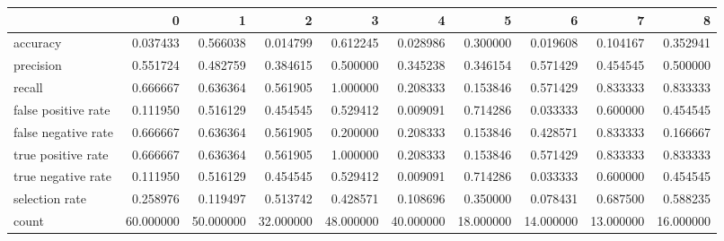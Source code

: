 \begin{tabular}{lrrrrrrrrr}
\toprule
{} &          0 &          1 &          2 &          3 &          4 &          5 &          6 &          7 &          8 \\
\midrule
accuracy            &   0.037433 &   0.566038 &   0.014799 &   0.612245 &   0.028986 &   0.300000 &   0.019608 &   0.104167 &   0.352941 \\
precision           &   0.551724 &   0.482759 &   0.384615 &   0.500000 &   0.345238 &   0.346154 &   0.571429 &   0.454545 &   0.500000 \\
recall              &   0.666667 &   0.636364 &   0.561905 &   1.000000 &   0.208333 &   0.153846 &   0.571429 &   0.833333 &   0.833333 \\
false positive rate &   0.111950 &   0.516129 &   0.454545 &   0.529412 &   0.009091 &   0.714286 &   0.033333 &   0.600000 &   0.454545 \\
false negative rate &   0.666667 &   0.636364 &   0.561905 &   0.200000 &   0.208333 &   0.153846 &   0.428571 &   0.833333 &   0.166667 \\
true positive rate  &   0.666667 &   0.636364 &   0.561905 &   1.000000 &   0.208333 &   0.153846 &   0.571429 &   0.833333 &   0.833333 \\
true negative rate  &   0.111950 &   0.516129 &   0.454545 &   0.529412 &   0.009091 &   0.714286 &   0.033333 &   0.600000 &   0.454545 \\
selection rate      &   0.258976 &   0.119497 &   0.513742 &   0.428571 &   0.108696 &   0.350000 &   0.078431 &   0.687500 &   0.588235 \\
count               &  60.000000 &  50.000000 &  32.000000 &  48.000000 &  40.000000 &  18.000000 &  14.000000 &  13.000000 &  16.000000 \\
\bottomrule
\end{tabular}
